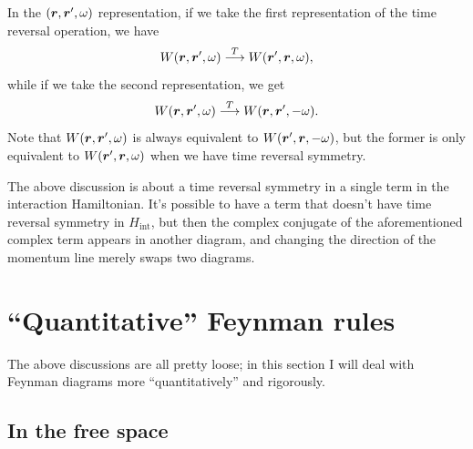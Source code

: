 \documentclass[hyperref, a4paper]{report}
\begin{document}
In the $(\vb*{r}, \vb*{r}', \omega)$ representation,
if we take the first representation of the time reversal operation,
we have 
\begin{equation}
    W(\vb*{r}, \vb*{r}', \omega) 
    \stackrel{T}{\longrightarrow} W(\vb*{r}', \vb*{r}, \omega),
\end{equation}
while if we take the second representation, we get 
\begin{equation}
    W(\vb*{r}, \vb*{r}', \omega) 
    \stackrel{T}{\longrightarrow} W(\vb*{r}, \vb*{r}', - \omega).
\end{equation}
Note that $W(\vb*{r}, \vb*{r}', \omega)$ is always equivalent to $W(\vb*{r}', \vb*{r}, -\omega)$,
but the former is only equivalent to $W(\vb*{r}', \vb*{r}, \omega)$
when we have time reversal symmetry.

The above discussion is about a time reversal symmetry in a single term 
in the interaction Hamiltonian.
It's possible to have a term that doesn't have time reversal symmetry in $H_{\text{int}}$,
but then the complex conjugate of the aforementioned complex term 
appears in another diagram,
and changing the direction of the momentum line 
merely swaps two diagrams.

\section{``Quantitative'' Feynman rules}

The above discussions are all pretty loose; 
in this section I will deal with Feynman diagrams more ``quantitatively'' and rigorously.

\subsection{In the free space}\label{sec:free-space}
\end{document}
